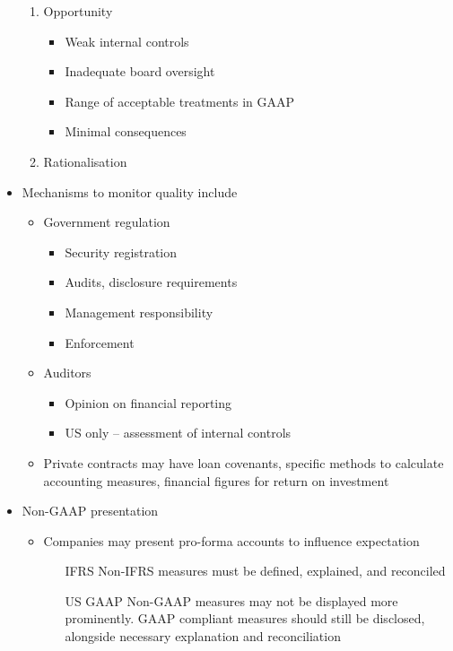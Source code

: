 \documentclass[../notes_compiled.tex]{subfiles}
\begin{document}
\begin{itemize}
\begin{enumerate}
\item Opportunity
\begin{itemize}
\item Weak internal controls
\item Inadequate board oversight
\item Range of acceptable treatments in GAAP
\item Minimal consequences
\end{itemize}


\item Rationalisation

\end{enumerate}

\item Mechanisms to monitor quality include
\begin{itemize}
\item Government regulation
\begin{itemize}
\item Security registration
\item Audits, disclosure requirements
\item Management responsibility 
\item Enforcement
\end{itemize}
\item Auditors
\begin{itemize}
\item Opinion on financial reporting
\item US only -- assessment of internal controls
\end{itemize}
\item Private contracts may have loan covenants, specific methods to calculate accounting measures, financial figures for return on investment
\end{itemize}

\item Non-GAAP presentation
\begin{itemize}
\item Companies may present pro-forma accounts to influence expectation
\begin{itemize}
\item[IFRS] Non-IFRS measures must be defined, explained, and reconciled
\item[US GAAP] Non-GAAP measures may not be displayed more prominently. GAAP compliant measures should still be disclosed, alongside necessary explanation and reconciliation
\end{itemize}
\end{itemize}
\end{itemize}
\end{document}
